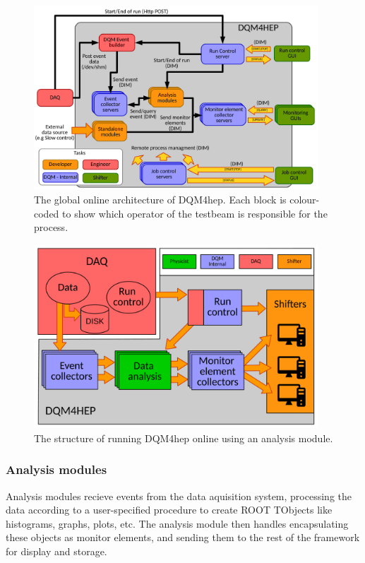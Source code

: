 \begin{figure}[p]
	\centering
	\includegraphics[width=0.95\textwidth]{../Pictures/GlobalArchitectureDiagram.pdf}
	\caption{The global online architecture of DQM4hep. Each block is colour-coded to show which operator of the testbeam is responsible for the process.}
	\label{figure:daq/dqm4hep/architecture}
\end{figure}

\begin{figure}[p]
	\centering
	\includegraphics[width=0.95\textwidth]{../Pictures/AnalysisModuleArchitecture.pdf}
	\caption{The structure of running DQM4hep online using an analysis module.}
	\label{figure:daq/dqm4hep/analysis-module}
\end{figure}

\subsubsection{Analysis modules}
Analysis modules recieve events from the data aquisition system, processing the data according to a user-specified procedure to create ROOT TObjects like histograms, graphs, plots, etc. The analysis module then handles encapsulating these objects as monitor elements, and sending them to the rest of the framework for display and storage. 

